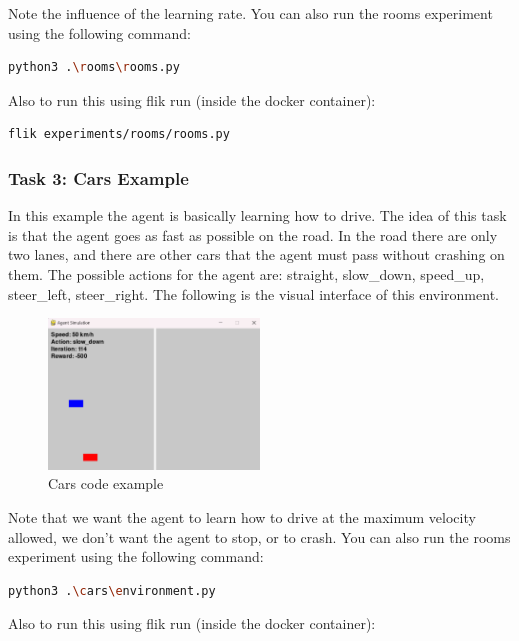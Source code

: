 Note the influence of the learning rate. You can also run the rooms experiment using the following command:

\begin{lstlisting}[language=bash]
python3 .\rooms\rooms.py
\end{lstlisting}

Also to run this using flik run (inside the docker container):

\begin{lstlisting}[language=bash]
flik experiments/rooms/rooms.py
\end{lstlisting}

\subsubsection{Task 3: Cars Example}

In this example the agent is basically learning how to drive. The idea of this task is that the agent 
goes as fast as possible on the road. In the road there are only two lanes, and there are other cars 
that the agent must pass without crashing on them. The possible actions for the agent are: straight, 
slow\_down, speed\_up, steer\_left, steer\_right. The following is the visual interface of this environment.

\begin{figure}[H]
    \centering
    \includegraphics[width=0.5\textwidth]{figures/cars_example.png}
    \caption{Cars code example}
    \label{fig:cars-code-example}
\end{figure}

Note that we want the agent to learn how to drive at the maximum velocity allowed, we don’t want 
the agent to stop, or to crash. You can also run the rooms experiment using the following command:

\begin{lstlisting}[language=bash]
python3 .\cars\environment.py
\end{lstlisting}

Also to run this using flik run (inside the docker container):

